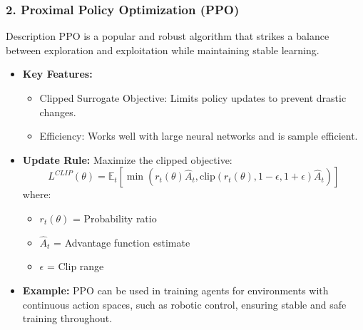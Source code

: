 \documentclass{beamer}
\begin{document}
\begin{frame}[fragile]
    \frametitle{2. Proximal Policy Optimization (PPO)}
    
    \begin{block}{Description}
        PPO is a popular and robust algorithm that strikes a balance between exploration and exploitation while maintaining stable learning.
    \end{block}
    
    \begin{itemize}
        \item \textbf{Key Features:}
        \begin{itemize}
            \item Clipped Surrogate Objective: Limits policy updates to prevent drastic changes.
            \item Efficiency: Works well with large neural networks and is sample efficient.
        \end{itemize}
        
        \item \textbf{Update Rule:}
        Maximize the clipped objective:
        \begin{equation}
        L^{CLIP}(\theta) = \mathbb{E}_t \left[ \min\left( r_t(\theta) \hat{A}_t, \text{clip}(r_t(\theta), 1 - \epsilon, 1 + \epsilon) \hat{A}_t \right) \right]
        \end{equation}
        where:
        \begin{itemize}
            \item $r_t(\theta)$ = Probability ratio
            \item $\hat{A}_t$ = Advantage function estimate
            \item $\epsilon$ = Clip range
        \end{itemize}
        
        \item \textbf{Example:}
        PPO can be used in training agents for environments with continuous action spaces, such as robotic control, ensuring stable and safe training throughout.
    \end{itemize}
\end{frame}
\end{document}
